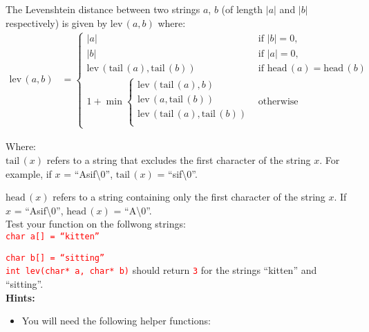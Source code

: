 \documentclass[12pt]{article}
\begin{document}
\begin{enumerate}
    The Levenshtein distance between two strings $a$, $b$ (of length $|a|$ and $|b|$ respectively) is given by $\text{lev} \, (a, b)$ where: \\
    
    \begin{align*}
        \text{lev} \, (a, b) &= \begin{cases}
            |a| & \text{if } |b| = 0, \\
            |b| & \text{if } |a| = 0, \\
            \text{lev} \, (\text{tail} \, (a), \text{tail} \, (b)) & \text{if } \text{head} \, (a) = \text{head} \, (b) \\
            1 + \min \begin{cases}
                \text{lev} \, (\text{tail} \, (a), b) \\
                \text{lev} \, (a, \text{tail} \, (b)) \\
                \text{lev} \, (\text{tail} \, (a), \text{tail} \, (b)) \\
            \end{cases} & \text{otherwise}
        \end{cases}
    \end{align*}

    Where: \\
    
    $\text{tail} \, (x)$ refers to a string that excludes the first character of the string $x$. For example, if $x$ = ``Asif\textbackslash 0'', $\text{tail} \, (x)$ = ``sif\textbackslash 0''. 

    $\text{head} \, (x)$ refers to a string containing only the first character of the string $x$. If $x$ = ``Asif\textbackslash 0'', $\text{head} \, (x)$ = ``A\textbackslash 0''. \\

    Test your function on the follwong strings: \\

    \textcolor{red}{\texttt{char a[] = ``kitten''}}  

    \textcolor{red}{\texttt{char b[] = ``sitting''}} \\

    \textcolor{red}{\texttt{int lev(char* a, char* b)}} should return \textcolor{red}{\texttt{3}} for the strings ``kitten'' and ``sitting''. \\

    \textbf{Hints:}

    \begin{itemize}
        \item You will need the following helper functions: \\
        

\end{itemize}
\end{enumerate}
\end{document}
